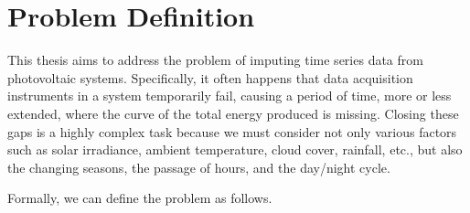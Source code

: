 \section{Problem Definition}
This thesis aims to address the problem of imputing time series data from
photovoltaic systems. Specifically, it often happens that data acquisition
instruments in a system temporarily fail, causing a period of time, more or
less extended, where the curve of the total energy produced is missing.
Closing these gaps is a highly complex task because we must consider not only various factors such as solar irradiance, ambient temperature, cloud cover, rainfall, etc., but also the changing seasons, the passage of hours, and the day/night cycle.

Formally, we can define the problem as follows. %

